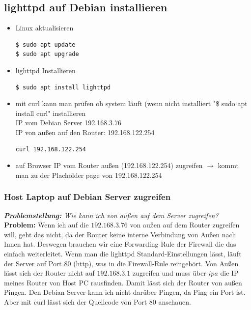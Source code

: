 \subsection{lighttpd auf Debian installieren}
\begin{itemize}
\item Linux aktualisieren
\begin{verbatim}
$ sudo apt update
$ sudo apt upgrade
\end{verbatim}

\item lighttpd Installieren
\begin{verbatim}
$ sudo apt install lighttpd
\end{verbatim}

\item mit curl kann man prüfen ob system läuft (wenn nicht installiert "\$ sudo apt install curl" installieren\\ IP vom Debian Server 192.168.3.76 \\ IP von außen auf den Router: 192.168.122.254
\begin{verbatim}
curl 192.168.122.254
\end{verbatim}

\item auf Browser IP vom Router außen (192.168.122.254) zugreifen $\rightarrow$ kommt man zu der Placholder page von 192.168.122.254
\end{itemize}

\newpage

\subsubsection{Host Laptop auf Debian Server zugreifen}
\textit{\textbf{Problemstellung:} Wie kann ich von außen auf dem Server zugreifen?}\\
\textbf{Problem:} Wenn ich auf die $192.168.3.76$ von außen auf dem Router zugreifen will, geht das nicht, da der Router keine interne Verbindung von Außen nach Innen hat. Deswegen brauchen wir eine Forwarding Rule der Firewall die das einfach weiterleitet. Wenn man die lighttpd Standard-Einstellungen lässt, läuft der Server auf Port 80 (http), was in die Firewall-Rule reingehört. Von Außen lässt sich der Router nicht auf $192.168.3.1$ zugreifen und muss über $ip a$ die IP meines Router von Host PC rausfinden. Damit lässt sich der Router von außen Pingen. Den Debian Server kann ich nicht darüber Pingen, da Ping ein Port ist. Aber mit curl lässt sich der Quellcode von Port 80 anschauen.

